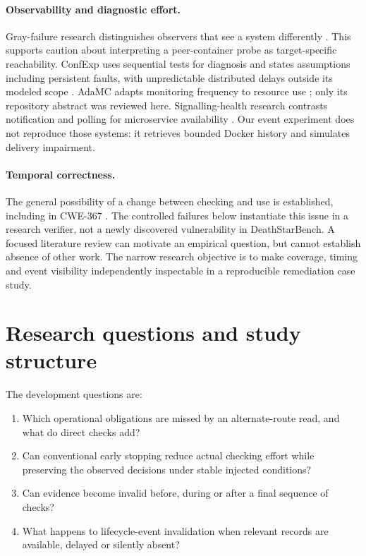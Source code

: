\documentclass[manuscript,review,nonacm]{acmart}
\begin{document}
\paragraph{Observability and diagnostic effort.}
Gray-failure research distinguishes observers that see a system differently \cite{gray}. This supports caution about interpreting a peer-container probe as target-specific reachability. ConfExp uses sequential tests for diagnosis and states assumptions including persistent faults, with unpredictable distributed delays outside its modeled scope \cite{confexp}. AdaMC adapts monitoring frequency to resource use \cite{adamc}; only its repository abstract was reviewed here. Signalling-health research contrasts notification and polling for microservice availability \cite{signalling}. Our event experiment does not reproduce those systems: it retrieves bounded Docker history and simulates delivery impairment.

\paragraph{Temporal correctness.}
The general possibility of a change between checking and use is established, including in CWE-367 \cite{cwe}. The controlled failures below instantiate this issue in a research verifier, not a newly discovered vulnerability in DeathStarBench. A focused literature review can motivate an empirical question, but cannot establish absence of other work. The narrow research objective is to make coverage, timing and event visibility independently inspectable in a reproducible remediation case study.

\section{Research questions and study structure}
The development questions are:
\begin{enumerate}
\item Which operational obligations are missed by an alternate-route read, and what do direct checks add?
\item Can conventional early stopping reduce actual checking effort while preserving the observed decisions under stable injected conditions?
\item Can evidence become invalid before, during or after a final sequence of checks?
\item What happens to lifecycle-event invalidation when relevant records are available, delayed or silently absent?
\end{enumerate}
\end{document}
